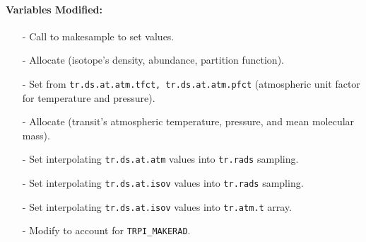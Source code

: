 \documentclass[letterpaper,12pt]{article}
\begin{document}
\paragraph{Variables Modified:}
\begin{enumerate}[leftmargin=10pt, noitemsep, parsep=0pt, topsep=0ex]
\item[-] Call to makesample to set  values.
\item[-] Allocate  (isotope's density, abundance, partition function).
\item[-] Set  from {\tt tr.ds.at.atm.tfct, tr.ds.at.atm.pfct} (atmospheric unit factor for temperature and pressure).
\item[-] Allocate  (transit's
  atmospheric temperature, pressure, and mean molecular mass).
\item[-] Set  interpolating
  {\tt tr.ds.at.atm} values into {\tt tr.rads} sampling.
\item[-] Set 
  interpolating {\tt tr.ds.at.isov} values into {\tt tr.rads}
  sampling.
\item[-] Set 
  interpolating {\tt tr.ds.at.isov} values into {\tt tr.atm.t} array.
\item[-] Modify  to account for {\tt TRPI\_MAKERAD}.
\end{enumerate}
\end{document}
